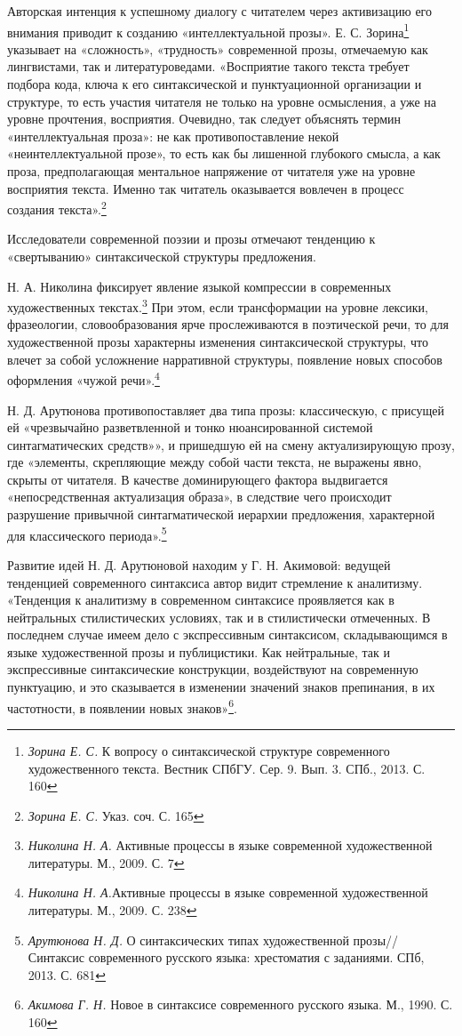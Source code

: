 \documentclass{kursa4}
\begin{document}
    Авторская интенция к успешному диалогу с читателем через активизацию его внимания приводит к созданию «интеллектуальной прозы». Е. С. Зорина\footnote{\textit{Зорина Е. С.} К вопросу о синтаксической структуре современного художественного текста. Вестник СПбГУ. Сер. 9. Вып. 3. СПб., 2013. С. 160} указывает на «сложность», «трудность» современной прозы, отмечаемую как лингвистами, так и литературоведами. «Восприятие такого текста требует подбора кода, ключа к его синтаксической и пунктуационной организации и структуре, то есть участия читателя не только на уровне осмысления, а уже на уровне прочтения, восприятия. Очевидно, так следует объяснять термин «интеллектуальная проза»: не как противопоставление некой «неинтеллектуальной прозе», то есть как бы лишенной глубокого смысла, а как проза, предполагающая ментальное напряжение от читателя уже на уровне восприятия текста. Именно так читатель оказывается вовлечен в процесс создания текста».\footnote{\textit{Зорина Е. С.} Указ. соч. С. 165} 

    Исследователи современной поэзии и прозы отмечают тенденцию к «свертыванию» синтаксической структуры предложения. 

    Н. А. Николина фиксирует явление языкой компрессии в современных художественных текстах.\footnote{\textit{Николина Н. А.} Активные процессы в языке современной художественной литературы. М., 2009. С. 7}  При  этом, если трансформации на уровне лексики, фразеологии, словообразования ярче прослеживаются в поэтической речи, то для художественной прозы характерны изменения синтаксической структуры, что влечет за собой усложнение нарративной структуры, появление новых способов оформления «чужой речи».\footnote{\textit{Николина Н. А.}Активные процессы в языке современной художественной литературы. М., 2009. С. 238}

    Н. Д. Арутюнова противопоставляет два типа прозы: классическую, с присущей ей «чрезвычайно разветвленной и тонко нюансированной системой синтагматических средств»», и пришедшую ей на смену актуализирующую прозу, где «элементы, скрепляющие между собой части текста, не выражены явно, скрыты от читателя. В качестве доминирующего фактора выдвигается «непосредственная актуализация образа», в следствие чего происходит разрушение привычной синтагматической иерархии предложения, характерной для классического периода».\footnote{\textit{Арутюнова Н. Д.} О синтаксических типах художественной прозы// Синтаксис современного русского языка: хрестоматия с заданиями. СПб, 2013. С. 681} 

    Развитие идей Н. Д. Арутюновой находим у Г. Н. Акимовой: ведущей тенденцией современного синтаксиса автор видит стремление к аналитизму. «Тенденция к аналитизму в современном синтаксисе проявляется как в нейтральных стилистических условиях, так и в стилистически отмеченных. В последнем случае имеем дело с экспрессивным синтаксисом, складывающимся в языке художественной прозы и публицистики. Как нейтральные, так и экспрессивные синтаксические конструкции, воздействуют на современную пунктуацию, и это сказывается в изменении значений знаков препинания, в их частотности, в появлении новых знаков»\footnote{\textit{Акимова Г. Н.} Новое в синтаксисе современного русского языка. М., 1990. С. 160}.
\end{document}
